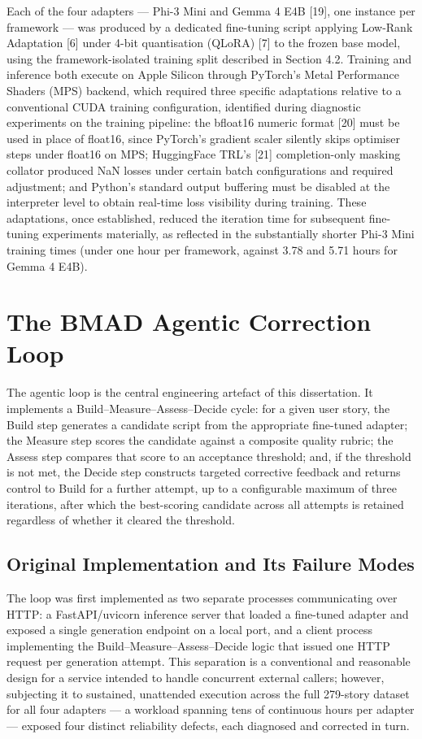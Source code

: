 Each of the four adapters --- Phi-3 Mini and Gemma 4 E4B {[}19{]}, one
instance per framework --- was produced by a dedicated fine-tuning
script
applying Low-Rank Adaptation {[}6{]} under 4-bit quantisation (QLoRA)
{[}7{]} to the frozen base model, using the framework-isolated training
split described in Section 4.2. Training and inference both execute on
Apple Silicon through PyTorch's Metal Performance Shaders (MPS) backend,
which required three specific adaptations relative to a conventional
CUDA training configuration, identified during diagnostic experiments
on the training pipeline: the bfloat16 numeric
format {[}20{]} must be used in place of float16, since PyTorch's
gradient scaler silently skips optimiser steps under float16 on MPS;
HuggingFace TRL's {[}21{]} completion-only masking collator produced NaN
losses under certain batch configurations and required adjustment; and
Python's standard output buffering must be disabled at the interpreter
level to obtain real-time loss visibility during training. These
adaptations, once established, reduced the iteration time for subsequent
fine-tuning experiments materially, as reflected in the substantially
shorter Phi-3 Mini training times (under one hour per framework, against
3.78 and 5.71 hours for Gemma 4 E4B).

\section{The BMAD Agentic Correction Loop}

The agentic loop is the central engineering artefact of this
dissertation. It implements a Build--Measure--Assess--Decide cycle: for
a given user story, the Build step generates a candidate script from the
appropriate fine-tuned adapter; the Measure step scores the candidate
against a composite quality rubric; the Assess step compares that score
to an acceptance threshold; and, if the threshold is not met, the Decide
step constructs targeted corrective feedback and returns control to
Build for a further attempt, up to a configurable maximum of three
iterations, after which the best-scoring candidate across all attempts
is retained regardless of whether it cleared the threshold.

\subsection{Original Implementation and Its Failure Modes}

The loop was first implemented as two separate processes communicating
over HTTP: a FastAPI/uvicorn inference server that loaded a fine-tuned
adapter and exposed a single generation endpoint on a local port, and a
client process implementing the Build--Measure--Assess--Decide logic
that issued one HTTP request per generation attempt. This separation is
a conventional and reasonable design for a service intended to handle
concurrent external callers; however, subjecting it to sustained,
unattended execution across the full 279-story dataset for all four
adapters --- a workload spanning tens of continuous hours per adapter
--- exposed four distinct reliability defects, each diagnosed and
corrected in turn.

